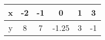 \begin{center}
    \begin{tabular}{|c|c|c|c|c|c|} 
        \hline
            x   & -2 & -1 & 0 & 1 & 3 \\ 
        \hline
            y   & 8 & 7 & -1.25 & 3 & -1 \\ 
        \hline
    \end{tabular}
\end{center}  